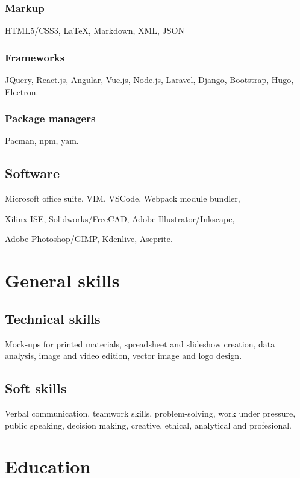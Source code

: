 \documentclass{scrartcl}
\begin{document}
    \subsubsection{Markup}

    HTML5/CSS3, {\LaTeX}, Markdown, XML, JSON

    \subsubsection{Frameworks}

    JQuery, React.js, Angular, Vue.js, Node.js, Laravel, Django, Bootstrap, Hugo, Electron.

    \subsubsection{Package managers}

    Pacman, npm, yam.

    \subsection{Software}

    Microsoft office suite, VIM, VSCode, Webpack module bundler,

    Xilinx ISE, Solidworks/FreeCAD, Adobe Illustrator/Inkscape,

    Adobe Photoshop/GIMP, Kdenlive, Aseprite.


  \section{General skills}

  \subsection{Technical skills}
  Mock-ups for printed materials, spreadsheet and slideshow creation, data analysis, image and video edition, vector image and logo design.

  \subsection{Soft skills}
  Verbal communication, teamwork skills, problem-solving, work under pressure, public speaking, decision making, creative, ethical, analytical and profesional.


  \section{Education}
\end{document}
